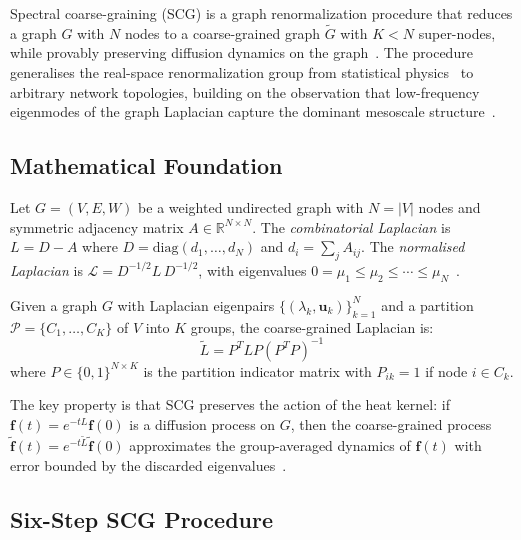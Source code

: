 Spectral coarse-graining (SCG) is a graph renormalization procedure that reduces a graph $G$ with $N$ nodes to a coarse-grained graph $\tilde{G}$ with $K < N$ super-nodes, while provably preserving diffusion dynamics on the graph~\cite{schmidt2024spectral}. The procedure generalises the real-space renormalization group from statistical physics~\cite{wilson1975renormalization} to arbitrary network topologies, building on the observation that low-frequency eigenmodes of the graph Laplacian capture the dominant mesoscale structure~\cite{villegas2023laplacian}.

\subsection{Mathematical Foundation}

Let $G = (V, E, W)$ be a weighted undirected graph with $N = |V|$ nodes and symmetric adjacency matrix $A \in \mathbb{R}^{N \times N}$. The \emph{combinatorial Laplacian} is $L = D - A$ where $D = \mathrm{diag}(d_1, \ldots, d_N)$ and $d_i = \sum_j A_{ij}$. The \emph{normalised Laplacian} is $\mathcal{L} = D^{-1/2} L \, D^{-1/2}$, with eigenvalues $0 = \mu_1 \leq \mu_2 \leq \cdots \leq \mu_N$~\cite{chung1997spectral}.

\begin{definition}
Given a graph $G$ with Laplacian eigenpairs $\{(\lambda_k, \mathbf{u}_k)\}_{k=1}^N$ and a partition $\mathcal{P} = \{C_1, \ldots, C_K\}$ of $V$ into $K$ groups, the coarse-grained Laplacian is:
\begin{equation}
    \tilde{L} = P^T L P \left(P^T P\right)^{-1}
    \label{eq:scg-laplacian}
\end{equation}
where $P \in \{0,1\}^{N \times K}$ is the partition indicator matrix with $P_{ik} = 1$ if node $i \in C_k$.
\end{definition}

The key property is that SCG preserves the action of the heat kernel: if $\mathbf{f}(t) = e^{-tL}\mathbf{f}(0)$ is a diffusion process on $G$, then the coarse-grained process $\tilde{\mathbf{f}}(t) = e^{-t\tilde{L}}\tilde{\mathbf{f}}(0)$ approximates the group-averaged dynamics of $\mathbf{f}(t)$ with error bounded by the discarded eigenvalues~\cite{schmidt2024spectral}.

\subsection{Six-Step SCG Procedure}

